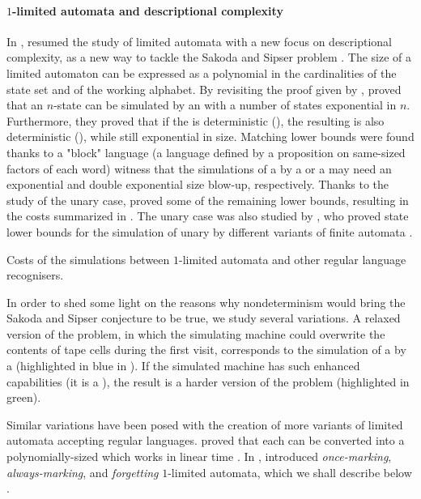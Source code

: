 \paragraph{$1$-limited automata and descriptional complexity}
In \citeyear{PigPis14}, \citeauthor{PigPis14} resumed the study of limited automata with a new focus on descriptional complexity, as a new way to tackle the Sakoda and Sipser problem \cite{PigPis14}.
The size of a limited automaton can be expressed as a polynomial in the cardinalities of the state set and of the working alphabet.
By revisiting the proof given by \citeauthor{WagWec86}, \citeauthor{PigPis14} proved that an $n$-state \OLA can be simulated by an \NFA with a number of states exponential in $n$.
Furthermore, they proved that if the \OLA is deterministic (\ODLA), the resulting \NFA is also deterministic (\DFA), while still exponential in size.
Matching lower bounds were found thanks to a "block" language (a language defined by a proposition on same-sized factors of each word) witness that the simulations of a \OLA by a \NFA or a \DFA may need an exponential and double exponential size blow-up, respectively.
Thanks to the study of the unary case, \citeauthor{PigPri19} proved some of the remaining lower bounds, resulting in the costs summarized in  \cite{PigPri19}.
The unary case was also studied by \citeauthor{KutWen15}, who proved state lower bounds for the simulation of unary \kLA by different variants of finite automata \cite{KutWen15}.

\begin{table}
	\centering
	\caption{Costs of the simulations between $1$-limited automata and other regular language recognisers.}
	\label{tab:sims-1la-general-context}
\end{table}

In order to shed some light on the reasons why nondeterminism would bring the Sakoda and Sipser conjecture to be true, we study several variations.
A relaxed version of the problem, in which the simulating machine could overwrite the contents of tape cells during the first visit, corresponds to the simulation of a \TNFA by a \ODLA (highlighted in blue in ).
If the simulated machine has such enhanced capabilities (\ie it is a \OLA), the result is a harder version of the problem (highlighted in green).

Similar variations have been posed with the creation of more variants of limited automata accepting regular languages.
\citeauthor{GuiPri19} proved that each \OLA can be converted into a polynomially-sized \OLA which works in linear time \cite{GuiPri19}.
In \citeyear{PigPri23a}, \citeauthor{PigPri23a} introduced \emph{once-marking}, \emph{always-marking}, and \emph{forgetting} $1$-limited automata, which we shall describe below \cite{PigPri23a,PigPri23}.



